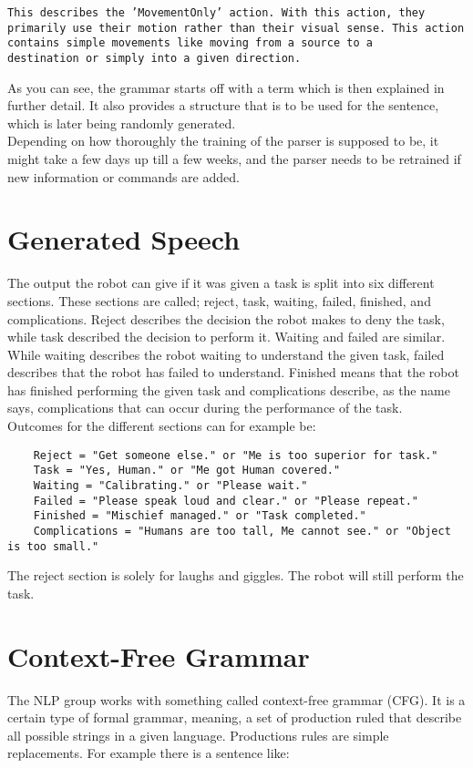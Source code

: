 \documentclass[main.tex]{subfiles}
\begin{document}
		\texttt{This describes the 'MovementOnly' action.
		With this action, they primarily use their motion rather than their visual sense. This action contains simple movements like moving from a source to a\\ destination or simply into a given direction.}
		



	As you can see, the grammar starts off with a term which is then explained in further detail. It also provides a structure that is to be used for the sentence, which is later being randomly generated.\\ 
	Depending on how thoroughly the training of the parser is supposed to be, it might take a few days up till a few weeks, and the parser needs to be retrained if new information or commands are added.

	\section{Generated Speech}
	The output the robot can give if it was given a task is split into six different sections. These sections are called; reject, task, waiting, failed, finished, and complications. Reject describes the decision the robot makes to deny the task, while task described the decision to perform it. Waiting and failed are similar. While waiting describes the robot waiting to understand the 
	given task, failed describes that the robot has failed to understand. Finished means that the robot has finished performing the given task and complications describe, as the name says, complications that can occur during the performance of the task.\\ 
	Outcomes for the different sections can for example be:
			
	\begin{verbatim}
	Reject = "Get someone else." or "Me is too superior for task."
	Task = "Yes, Human." or "Me got Human covered."
	Waiting = "Calibrating." or "Please wait."
	Failed = "Please speak loud and clear." or "Please repeat."
	Finished = "Mischief managed." or "Task completed."
	Complications = "Humans are too tall, Me cannot see." or "Object is too small."
	\end{verbatim}
	
	The reject section is solely for laughs and giggles. The robot will still perform the task.
	
	\section{Context-Free Grammar}
	The NLP group works with something called context-free grammar (CFG). It is a certain type of formal grammar, meaning, a set of production ruled that describe all possible strings in a given language. Productions rules are simple replacements. For example there is a sentence like:
\end{document}
